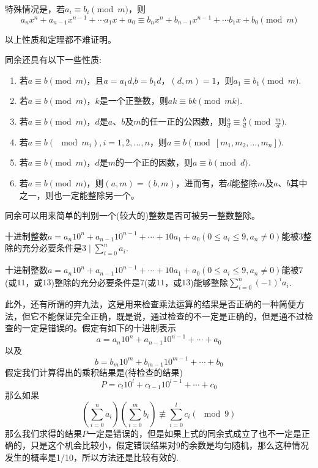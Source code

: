 特殊情况是，若$a_i \equiv b_i \pmod{m}$，则
\[ a_nx^n+a_{n-1}x^{n-1}+\cdots a_1x+a_0 \equiv b_nx^n+b_{n-1}x^{n-1}+\cdots b_1x+b_0 \pmod{m} \]

以上性质和定理都不难证明。

\begin{theorem}
  同余还具有以下一些性质:
  \begin{enumerate}
  \item 若$a \equiv b \pmod{m}$，且$a=a_1d$,$b=b_1d$，$(d,m)=1$，则$a_1 \equiv b_1 \pmod{m}$.
  \item 若$a \equiv b \pmod{m}$，$k$是一个正整数，则$ak \equiv bk \pmod{mk}$.
  \item 若$a \equiv b \pmod{m}$，$d$是$a$、$b$及$m$的任一正的公因数，则$\frac{a}{d} \equiv \frac{b}{d} \pmod{\frac{m}{d}}$. 
  \item 若$a \equiv b (\mod m_i),i=1,2,\ldots,n$，则$a \equiv b \pmod{[m_1,m_2,\ldots,m_n]}$.
  \item 若$a \equiv b \pmod{m}$，$d$是$m$的一个正的因数，则$a \equiv b \pmod{d}$.
  \item 若$a \equiv b \pmod{m}$，则$(a,m)=(b,m)$，进而有，若$d$能整除$m$及$a$、$b$其中之一，则也一定能整除另一个。
  \end{enumerate}
\end{theorem}

同余可以用来简单的判别一个(较大的)整数是否可被另一整数整除。
\begin{theorem}
  十进制整数$a=a_n10^n+a_{n-1}10^{n-1}+\cdots+10a_1+a_0(0 \leqslant a_i \leqslant 9, a_n \neq 0)$能被$3$整除的充分必要条件是$3 \mid \sum_{i=0}^na_i$.
\end{theorem}

\begin{theorem}
  十进制整数$a=a_n10^n+a_{n-1}10^{n-1}+\cdots+10a_1+a_0(0 \leqslant a_i \leqslant 9, a_n \neq 0)$能被$7$(或$11$，或$13$)整除的充分必要条件是$7$(或$11$，或$13$)能够整除$\sum_{i=0}^n(-1)^ia_i$.
\end{theorem}

此外，还有所谓的弃九法，这是用来检查乘法运算的结果是否正确的一种简便方法，但它不能保证完全正确，既是说，通过检查的不一定是正确的，但是通不过检查的一定是错误的。假定有如下的十进制表示
\[ a = a_n10^n+a_{n-1}10^{n-1}+\cdots+a_0 \]
以及
\[ b = b_m10^m+b_{m-1}10^{m-1}+\cdots+b_0 \]
假定我们计算得出的乘积结果是(待检查的结果)
\[ P = c_l10^l+c_{l-1}10^{l-1}+\cdots+c_0 \]
那么如果
\[ \left( \sum_{i=0}^n a_i \right) \left( \sum_{i=0}^m b_i \right) \not \equiv \sum_{i=0}^l c_i (\mod 9) \]
那么我们求得的结果$P$一定是错误的，但是如果上式的同余式成立了也不一定是正确的，只是这个机会比较小，假定错误结果对9的余数是均匀随机，那么这种情况发生的概率是1/10，所以方法还是比较有效的.


